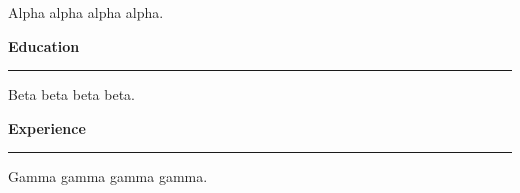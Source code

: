 \documentclass[11pt]{article}
\newcommand{\head}[1]{{\large\bfseries #1}\\[-6pt]\rule{\textwidth}{0.6pt}}
\begin{document}
Alpha alpha alpha alpha.

\head{Education}
Beta beta beta beta.

\head{Experience}
Gamma gamma gamma gamma.
\end{document}
